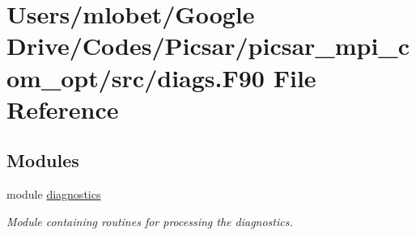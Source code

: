 \hypertarget{diags_8_f90}{}\section{Users/mlobet/\+Google Drive/\+Codes/\+Picsar/picsar\+\_\+mpi\+\_\+com\+\_\+opt/src/diags.F90 File Reference}
\label{diags_8_f90}
\subsection*{Modules}
\begin{DoxyCompactItemize}
\item 
module \hyperlink{namespacediagnostics}{diagnostics}
\begin{DoxyCompactList}\small\item\em Module containing routines for processing the diagnostics. \end{DoxyCompactList}\end{DoxyCompactItemize}
